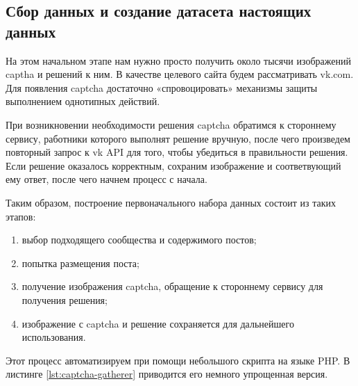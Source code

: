 \subsection{Сбор данных и создание датасета настоящих данных}
На этом начальном этапе нам нужно просто получить около тысячи изображений captha и решений к ним. В качестве целевого сайта будем рассматривать vk.com. Для появления captcha достаточно «спровоцировать» механизмы защиты выполнением однотипных действий. 

При возникновении необходимости решения captcha обратимся к стороннему сервису, работники которого выполнят решение вручную, после чего произведем повторный запрос к vk API для того, чтобы убедиться в правильности решения. Если решение оказалось корректным, сохраним изображение и соответвующий ему ответ, после чего начнем процесс с начала.

Таким образом, построение первоначального набора данных состоит из таких этапов:
\begin{enumerate}[1)]
	\item выбор подходящего сообщества и содержимого постов;
	\item попытка размещения поста;
	\item получение изображения captcha, обращение к стороннему сервису для получения решения;
	\item изображение с captcha и решение сохраняется для дальнейшего использования.

\end{enumerate}

Этот процесс автоматизируем при помощи небольшого скрипта на языке PHP. В листинге \ref{lst:captcha-gatherer} приводится его немного упрощенная версия.

